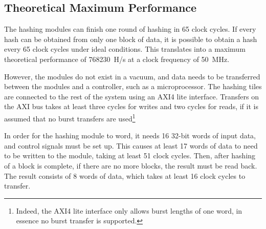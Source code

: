 %
%

\subsection{Theoretical Maximum Performance}

The hashing modules can finish one round of hashing in 65 clock cycles. If
every hash can be obtained from only one block of data, it is possible to
obtain a hash every 65 clock cycles under ideal conditions. This translates
into a maximum theoretical performance of 768230~H/s at a clock frequency of
50~MHz.

However, the modules do not exist in a vacuum, and data needs to be transferred
between the modules and a controller, such as a microprocessor. The hashing tiles
are connected to the rest of the system using an AXI4 lite interface. Transfers
on the AXI bus takes at least three cycles for writes and two cycles for reads,
if it is assumed that no burst transfers are used\footnote{Indeed, the AXI4 lite
interface only allows burst lengths of one word, in essence no burst transfer is
supported.}

In order for the hashing module to word, it needs 16 32-bit words of input data,
and control signals must be set up. This causes at least 17 words of data to
need to be written to the module, taking at least 51 clock cycles. Then, after
hashing of a block is complete, if there are no more blocks, the result must
be read back. The result consists of 8 words of data, which takes at least 16
clock cycles to transfer.

